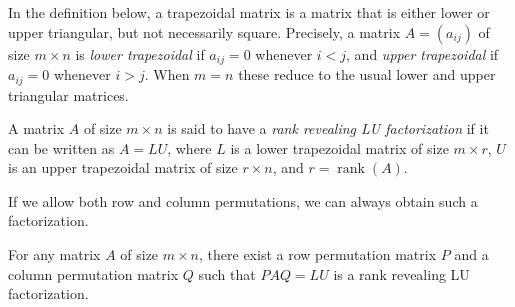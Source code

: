 \documentclass[10pt,twoside]{siamart1116}
\DeclareMathOperator{\rk}{rank}
\newcommand{\by}{\times}
\numberwithin{theorem}{section}
\providecommand{\DIFadd}[1]{{\protect\color{blue} \sf #1}} %
\begin{document}
\DIFadd{In the definition below, a trapezoidal matrix is a matrix that is either lower or upper triangular, but not necessarily square. Precisely, a matrix $A = (a_{ij})$ of size $m \by n$ is \emph{lower trapezoidal} if $a_{ij} = 0$ whenever $i < j$, and \emph{upper trapezoidal} if $a_{ij} = 0$ whenever $i > j$. When $m = n$ these reduce to the usual lower and upper triangular matrices.
}

\begin{definition}\label{def:rank_revealing}
  \DIFadd{A matrix $A$ of size $m \by n$ is said to have a \emph{rank revealing LU factorization} if it can be written as $A = LU$, where $L$ is a lower trapezoidal matrix of size $m \by r$, $U$ is an upper trapezoidal matrix of size $r \by n$, and $r = \rk(A)$.
}\end{definition}

\DIFadd{If we allow both row and column permutations, we can always obtain such a factorization.
}

\begin{theorem}\label{thm:row_column_permutation}
  \DIFadd{For any matrix $A$ of size $m \by n$, there exist a row permutation matrix $P$ and a column permutation matrix $Q$ such that $PAQ = LU$ is a rank revealing LU factorization.
}\end{theorem}
\end{document}
